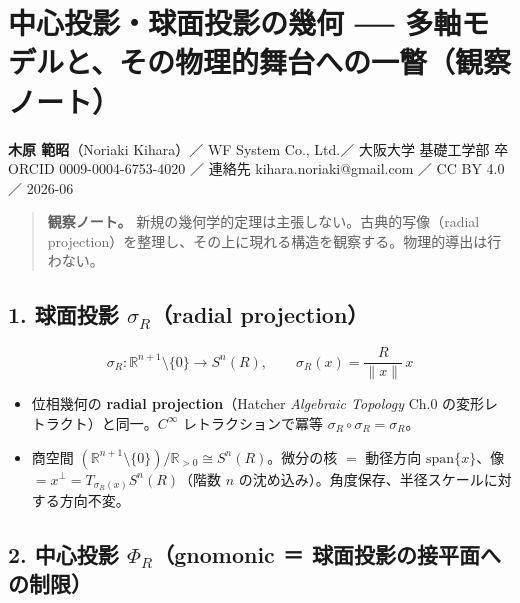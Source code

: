 \documentclass[
  9pt,
]{ltjsarticle}
\author{}
\date{}
\providecommand{\tightlist}{%
  \setlength{\itemsep}{0pt}\setlength{\parskip}{0pt}}
\begin{document}
\section{中心投影・球面投影の幾何 ──
多軸モデルと、その物理的舞台への一瞥（観察ノート）}\label{ux4e2dux5fc3ux6295ux5f71ux7403ux9762ux6295ux5f71ux306eux5e7eux4f55-ux591aux8ef8ux30e2ux30c7ux30ebux3068ux305dux306eux7269ux7406ux7684ux821eux53f0ux3078ux306eux4e00ux77a5ux89b3ux5bdfux30ceux30fcux30c8}

\textbf{木原 範昭}（Noriaki Kihara）／ WF System Co., Ltd.／ 大阪大学
基礎工学部 卒 ORCID 0009-0004-6753-4020 ／ 連絡先
kihara.noriaki@gmail.com ／ CC BY 4.0 ／ 2026-06

\begin{quote}
\textbf{観察ノート。} 新規の幾何学的定理は主張しない。古典的写像（radial
projection）を整理し、その上に現れる構造を観察する。物理的導出は行わない。
\end{quote}

\subsection{\texorpdfstring{1. 球面投影 \(\sigma_R\)（radial
projection）}{1. 球面投影 \textbackslash sigma\_R（radial projection）}}\label{ux7403ux9762ux6295ux5f71-sigma_rradial-projection}

\[\sigma_R:\mathbb{R}^{n+1}\setminus\{0\}\to S^n(R),\qquad \sigma_R(x)=\frac{R}{\|x\|}\,x\]

\begin{itemize}
\tightlist
\item
  位相幾何の \textbf{radial projection}（Hatcher \emph{Algebraic
  Topology} Ch.0 の変形レトラクト）と同一。\(C^\infty\)
  レトラクションで冪等 \(\sigma_R\circ\sigma_R=\sigma_R\)。
\item
  商空間
  \((\mathbb{R}^{n+1}\setminus\{0\})/\mathbb{R}_{>0}\cong S^n(R)\)。微分の核
  \(=\) 動径方向 \(\mathrm{span}\{x\}\)、像
  \(=x^{\perp}=T_{\sigma_R(x)}S^n(R)\)（階数 \(n\)
  の沈め込み）。角度保存、半径スケールに対する方向不変。
\end{itemize}

\subsection{\texorpdfstring{2. 中心投影 \(\Phi_R\)（gnomonic ＝
球面投影の接平面への制限）}{2. 中心投影 \textbackslash Phi\_R（gnomonic ＝ 球面投影の接平面への制限）}}\label{ux4e2dux5fc3ux6295ux5f71-phi_rgnomonic-ux7403ux9762ux6295ux5f71ux306eux63a5ux5e73ux9762ux3078ux306eux5236ux9650}
\end{document}
